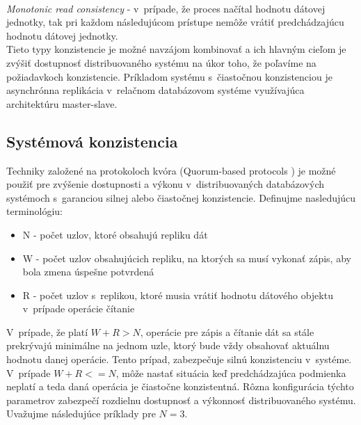 \documentclass[11pt,twoside,a4paper]{book}
\begin{document}
\noindent 
\\
\emph{Monotonic read consistency} - v~prípade, že proces načítal hodnotu dátovej jednotky, tak pri každom následujúcom prístupe nemôže vrátiť predchádzajúcu hodnotu dátovej jednotky. \\



Tieto typy konzistencie je možné navzájom kombinovať a ich hlavným cieľom je zvýšiť dostupnosť distribuovaného systému na úkor toho, že poľavíme na požiadavkoch konzistencie. Príkladom systému s~čiastočnou konzistenciou je asynchrónna replikácia v~relačnom databázovom systéme využívajúca architektúru master-slave.

\subsection{Systémová konzistencia}
\label{section:Consistency}
Techniky založené na protokoloch kvóra (Quorum-based protocols \cite{gifford1979weighted}) je možné použiť pre zvýšenie dostupnosti a výkonu v~distribuovaných databázových systémoch s~garanciou silnej alebo čiastočnej konzistencie. Definujme nasledujúcu terminológiu:
\begin{itemize}
 \item N - počet uzlov, ktoré obsahujú repliku dát
 \item W - počet uzlov obsahujúcich repliku, na ktorých sa musí vykonať zápis, aby bola zmena úspešne potvrdená
 \item R - počet uzlov s~replikou, ktoré musia vrátiť hodnotu dátového objektu v~prípade operácie čítanie
\end{itemize}

V~prípade, že platí $W + R > N$, operácie pre zápis a čítanie dát sa stále prekrývajú minimálne na jednom uzle, ktorý bude vždy obsahovať aktuálnu hodnotu danej operácie. Tento prípad, zabezpečuje silnú konzistenciu v~systéme. V~prípade $W + R <= N$, môže nastať situácia keď predchádzajúca podmienka neplatí a teda daná operácia je čiastočne konzistentná. Rôzna konfigurácia týchto parametrov zabezpečí rozdielnu dostupnosť a výkonnosť distribuovaného systému.  Uvažujme následujúce príklady pre $N = 3$.
\end{document}
